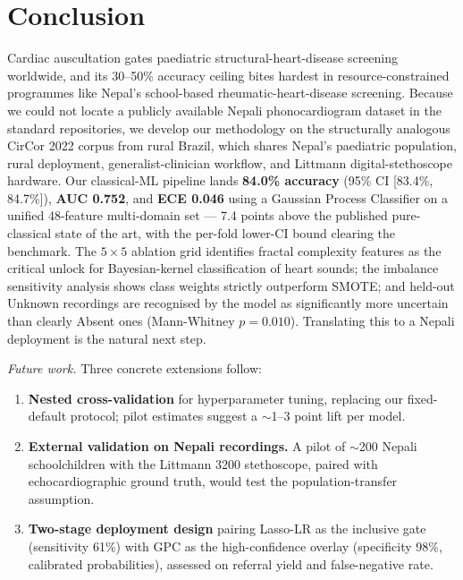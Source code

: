 \documentclass[10pt,twocolumn]{article}
\begin{document}
\section{Conclusion}

Cardiac auscultation gates paediatric structural-heart-disease screening worldwide, and its 30--50\% accuracy ceiling bites hardest in resource-constrained programmes like Nepal's school-based rheumatic-heart-disease screening. Because we could not locate a publicly available Nepali phonocardiogram dataset in the standard repositories, we develop our methodology on the structurally analogous CirCor 2022 corpus from rural Brazil, which shares Nepal's paediatric population, rural deployment, generalist-clinician workflow, and Littmann digital-stethoscope hardware. Our classical-ML pipeline lands \textbf{84.0\% accuracy} (95\% CI [83.4\%, 84.7\%]), \textbf{AUC 0.752}, and \textbf{ECE 0.046} using a Gaussian Process Classifier on a unified 48-feature multi-domain set --- 7.4 points above the published pure-classical state of the art, with the per-fold lower-CI bound clearing the benchmark. The $5 \times 5$ ablation grid identifies fractal complexity features as the critical unlock for Bayesian-kernel classification of heart sounds; the imbalance sensitivity analysis shows class weights strictly outperform SMOTE; and held-out Unknown recordings are recognised by the model as significantly more uncertain than clearly Absent ones (Mann-Whitney $p = 0.010$). Translating this to a Nepali deployment is the natural next step.

\textit{Future work.} Three concrete extensions follow:
\begin{enumerate}[leftmargin=*, itemsep=0.05em]
    \item \textbf{Nested cross-validation} for hyperparameter tuning, replacing our fixed-default protocol; pilot estimates suggest a $\sim$1--3 point lift per model.
    \item \textbf{External validation on Nepali recordings.} A pilot of $\sim$200 Nepali schoolchildren with the Littmann 3200 stethoscope, paired with echocardiographic ground truth, would test the population-transfer assumption.
    \item \textbf{Two-stage deployment design} pairing Lasso-LR as the inclusive gate (sensitivity 61\%) with GPC as the high-confidence overlay (specificity 98\%, calibrated probabilities), assessed on referral yield and false-negative rate.
\end{enumerate}
\end{document}
